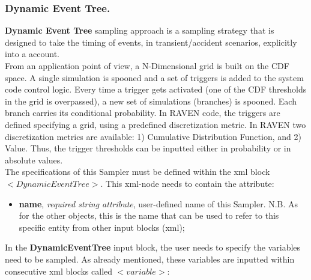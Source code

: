 \subsubsection{Dynamic Event Tree.}
\label{subsubsubsec:DET}
\textbf{Dynamic Event Tree} sampling approach is a sampling strategy that is designed to take the timing of events, in transient/accident scenarios, explicitly into a account.
\\ From an application point of view, a N-Dimensional grid is built on the CDF space. A single simulation is spooned and a set of triggers is added to the system code control logic. Every time a trigger gets activated (one of the CDF thresholds in the grid is overpassed), a new set of simulations (branches) is spooned. Each branch carries its conditional probability. In RAVEN code, the triggers are defined specifying a grid, using a predefined discretization metric.
In RAVEN two discretization metrics are available: 1) Cumulative Distribution Function, and 2) Value. Thus, the trigger thresholds can be inputted either in probability or in absolute values.
\\ The specifications of this Sampler must be defined within the xml block $<DynamicEventTree>$. This xml-node needs to contain the attribute:
\begin{itemize}
\itemsep0em
\item \textbf{name}, \textit{required string attribute}, user-defined name of this Sampler. N.B. As for the other objects, this is the name that can be used to refer to this specific entity from other input blocks (xml);
\end{itemize}
In the \textbf{DynamicEventTree} input block, the user needs to specify the variables need to be sampled. As already mentioned, these variables are inputted within consecutive xml blocks called $<variable>$:
